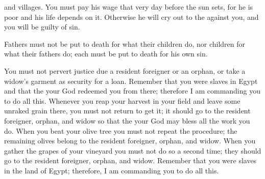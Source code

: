 {and villages.
You must pay
his wage
that very day
before the sun
sets,
for
he is poor
and his life
depends
on
it. Otherwise he will cry out
to
the {}
against you, and you will be
guilty of sin.
\par }{\PP {}Fathers
must not
be put to death
for what their children
do, nor
children
for what their fathers
do; each
must be put to death
for his own sin.
\par }{\PP {}You must not
pervert
justice
due a resident foreigner
or an orphan,
or
take
a widow’s
garment
as security for a loan.
Remember
that
you were slaves
in Egypt
and that the
{}
your God
redeemed
you from there;
therefore
I am
commanding
you to do
all
this.
Whenever
you reap
your harvest
in your field
and leave some unraked
grain there,
you must not
return
to get
it; it should
go to the resident foreigner,
orphan,
and widow
so
that the
{}
your God
may bless
all
the work you do.
When
you beat
your olive
tree you must not
repeat
the procedure;
the remaining olives belong to the resident foreigner,
orphan,
and widow.
When
you gather the grapes
of your vineyard
you must not
do so
a second time;
they should go
to the resident foreigner,
orphan,
and widow.
Remember
that
you were slaves
in the land
of Egypt;
therefore,
I am
commanding
you to do
all
this.

}
